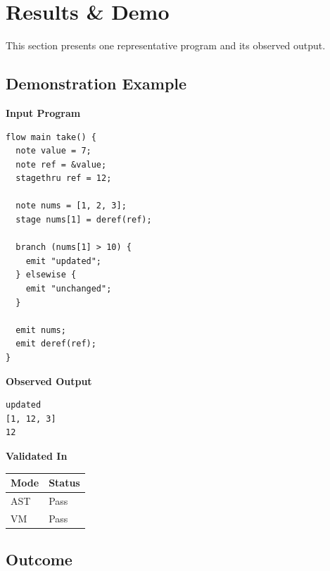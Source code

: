 \documentclass[12pt,a4paper]{article}
\begin{document}
\section{Results \& Demo}

This section presents one representative program and its observed output.

\subsection*{Demonstration Example}

\begin{minipage}[t]{0.56\textwidth}
\textbf{Input Program}
\vspace{0.35em}

\begin{lstlisting}[style=orchestra]
flow main take() {
  note value = 7;
  note ref = &value;
  stagethru ref = 12;

  note nums = [1, 2, 3];
  stage nums[1] = deref(ref);

  branch (nums[1] > 10) {
    emit "updated";
  } elsewise {
    emit "unchanged";
  }

  emit nums;
  emit deref(ref);
}
\end{lstlisting}
\end{minipage}\hfill
\begin{minipage}[t]{0.39\textwidth}
\textbf{Observed Output}
\vspace{0.35em}

\begin{lstlisting}[style=console]
updated
[1, 12, 3]
12
\end{lstlisting}

\vspace{0.7em}
\textbf{Validated In}

\begin{table}[H]
\centering
\begin{tabular}{ll}
\toprule
Mode & Status \\
\midrule
AST & Pass \\
VM & Pass \\
\bottomrule
\end{tabular}
\end{table}
\end{minipage}

\subsection*{Outcome}
\end{document}
